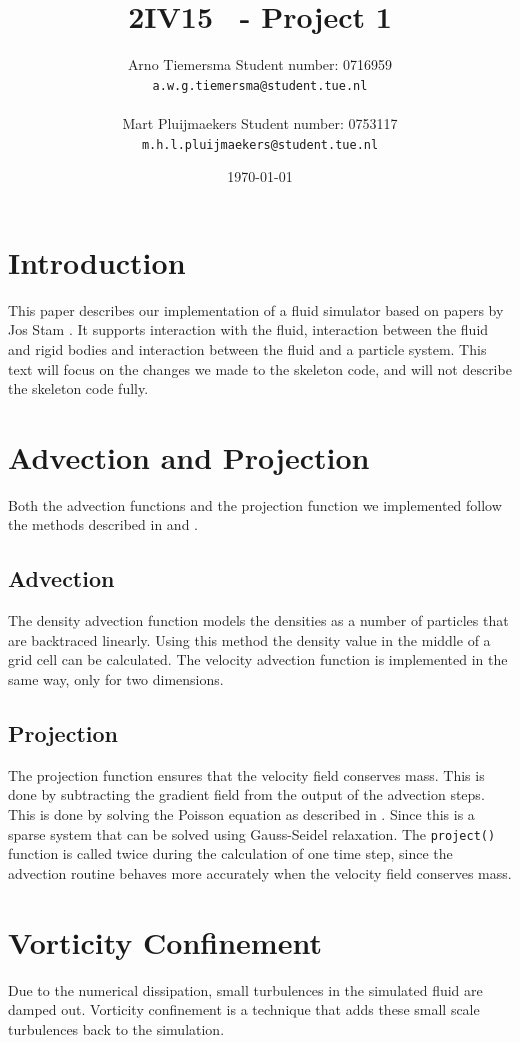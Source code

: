\documentclass[a4paper,twoside,11pt,twocolumn]{article}
\title{\sffamily\bfseries 2IV15 \scg\ - Project 1}
\author{Arno Tiemersma \qquad Student number: 0716959 \\{\tt a.w.g.tiemersma@student.tue.nl}\\ \\Mart Pluijmaekers \qquad Student number: 0753117 \\{\tt m.h.l.pluijmaekers@student.tue.nl}}
\date{\today}
\begin{document}
\maketitle
\section{Introduction}
This paper describes our implementation of a fluid simulator based on papers by Jos Stam \cite{url:stam1, url:stam2}. It supports interaction with the fluid, interaction between the fluid and rigid bodies and interaction between the fluid and a particle system. This text will focus on the changes we made to the skeleton code, and will not describe the skeleton code fully.

\section{Advection and Projection}
Both the advection functions and the projection function we implemented follow the methods described in \cite{url:stam1} and \cite{url:stam2}.

\subsection{Advection}
The density advection function models the densities as a number of particles that are backtraced linearly. Using this method the density value in the middle of a grid cell can be calculated. The velocity advection function is implemented in the same way, only for two dimensions.

\subsection{Projection}
The projection function ensures that the velocity field conserves mass. This is done by subtracting the gradient field from the output of the advection steps. This is done by solving the Poisson equation as described in \cite{url:stam2}. Since this is a sparse system that can be solved using Gauss-Seidel relaxation. The \texttt{project()} function is called twice during the calculation of one time step, since the advection routine behaves more accurately when the velocity field conserves mass. 

\section{Vorticity Confinement}
Due to the numerical dissipation, small turbulences in the simulated fluid are damped out. Vorticity confinement is a technique that adds these small scale turbulences back to the simulation.
 
\end{document}
